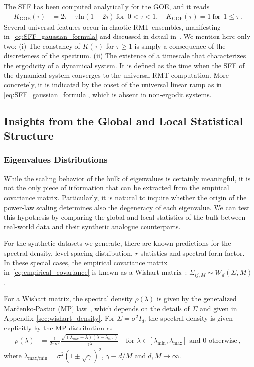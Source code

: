 \documentclass{article}
\begin{document}
The SFF has been computed analytically for the GOE, and it reads
\begin{align}
\label{eq:SFF_gaussian_formula}
K_{\mathrm{GOE}}(\tau) &= 2\tau - \tau  \mathrm{ln}(1 + 2\tau) \
\text{for}~~0 < \tau < 1, \quad
K_{\mathrm{GOE}}(\tau) = 1 
\
\text{for}~~ 1 \leq \tau 
\ .
\end{align}
Several universal features occur in chaotic RMT ensembles, manifesting in~\cref{eq:SFF_gaussian_formula} and discussed in detail in~\citet{Liu_2018,Kim_2023}. We mention here only two: (i) The
constancy of $K(\tau)$ for $\tau \geq 1$ is simply a consequence of the discreteness of the spectrum.
(ii) The existence of a timescale that characterizes the ergodicity of a dynamical system. It is defined as the time when the SFF of the dynamical system converges to the universal RMT computation. More concretely, it is indicated by the onset of the universal linear ramp as in \eqref{eq:SFF_gaussian_formula},
which is absent in non-ergodic systems. 

\subsection{Insights from the Global and Local Statistical Structure}

\subsubsection{Eigenvalues Distributions}
While the scaling behavior of the bulk of eigenvalues is certainly meaningful, it is not the only piece of information that can be extracted from the empirical covariance matrix. Particularly, it is natural to inquire whether the origin of the power-law scaling determines also the degeneracy of each eigenvalue. We can test this hypothesis by comparing the global and local statistics of the bulk between real-world data and their synthetic analogue counterparts.


For the synthetic datasets we generate, there are known predictions for the spectral density, level spacing distribution, $r$-statistics and spectral form factor. In these special cases, the empirical covariance matrix in~\cref{eq:empirical_covariance} is known as a Wishart matrix~\citep{wishart1928generalised}: $\Sigma_{ij, M}\sim \mathcal{W}_d(\Sigma, M)$.

For a Wishart matrix, the spectral density $\rho(\lambda)$ is given by the generalized Marčenko-Pastur (MP) law~\cite{couillet_liao_2022}, which depends on the details of $\Sigma$ and given in Appendix~\ref{sec:wishart_density}. For $\Sigma = \sigma^2 I_d$, the spectral density is given explicitly by the MP distribution as
\begin{align}
\rho(\lambda) &= 
\frac{1}{2 \pi \sigma^2}  
\frac{\sqrt{(\lambda_{\text{max}}-\lambda)(\lambda-\lambda_{\text{min}})}}{ 
\gamma \lambda} 
\quad \text{for } \lambda \in [\lambda_{\text{min}}, \lambda_{\text{max}}] \text{ and 0 otherwise} \ ,
\end{align}
where $\lambda_\mathrm{max/min} = \sigma^2 (1\pm \sqrt{\gamma})^2$, $\gamma \equiv d/M$ and $d,M \to \infty$.
\end{document}
